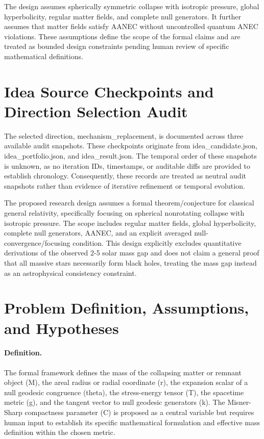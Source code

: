 \documentclass[conference]{IEEEtran}
\begin{document}
The design assumes spherically symmetric collapse with isotropic pressure, global hyperbolicity, regular matter fields, and complete null generators. It further assumes that matter fields satisfy AANEC without uncontrolled quantum ANEC violations. These assumptions define the scope of the formal claims and are treated as bounded design constraints pending human review of specific mathematical definitions.

\section{Idea Source Checkpoints and Direction Selection Audit}
The selected direction, mechanism\_replacement, is documented across three available audit snapshots. These checkpoints originate from idea\_candidate.json, idea\_portfolio.json, and idea\_result.json. The temporal order of these snapshots is unknown, as no iteration IDs, timestamps, or auditable diffs are provided to establish chronology. Consequently, these records are treated as neutral audit snapshots rather than evidence of iterative refinement or temporal evolution.

The proposed research design assumes a formal theorem/conjecture for classical general relativity, specifically focusing on spherical nonrotating collapse with isotropic pressure. The scope includes regular matter fields, global hyperbolicity, complete null generators, AANEC, and an explicit averaged null-convergence/focusing condition. This design explicitly excludes quantitative derivations of the observed 2-5 solar mass gap and does not claim a general proof that all massive stars necessarily form black holes, treating the mass gap instead as an astrophysical consistency constraint.

\section{Problem Definition, Assumptions, and Hypotheses}
\paragraph{Definition.} The formal framework defines the mass of the collapsing matter or remnant object (M), the areal radius or radial coordinate (r), the expansion scalar of a null geodesic congruence (theta), the stress-energy tensor (T), the spacetime metric (g), and the tangent vector to null geodesic generators (k). The Misner-Sharp compactness parameter (C) is proposed as a central variable but requires human input to establish its specific mathematical formulation and effective mass definition within the chosen metric.
\end{document}
